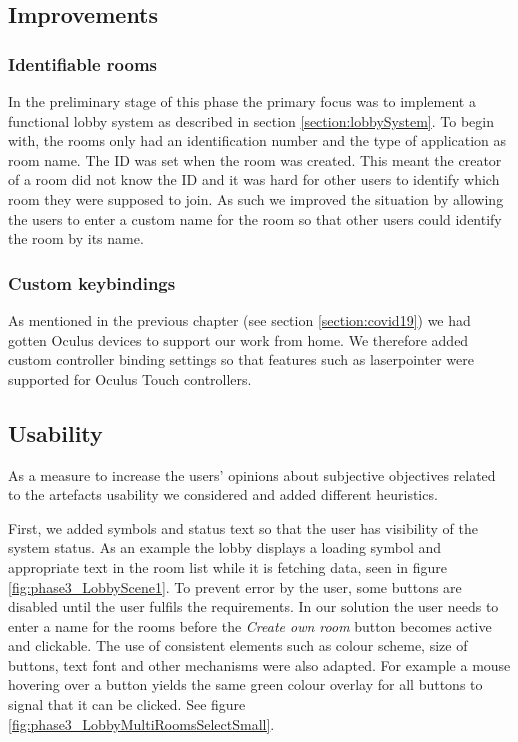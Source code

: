 \subsection{Improvements}


\subsubsection{Identifiable rooms}
In the preliminary stage of this phase the primary focus was to implement a functional lobby system as described in section \ref{section:lobbySystem}. To begin with, the rooms only had an identification number and the type of application as room name. The ID was set when the room was created. This meant the creator of a room did not know the ID and it was hard for other users to identify which room they were supposed to join. As such we improved the situation by allowing the users to enter a custom name for the room so that other users could identify the room by its name.   


\subsubsection{Custom keybindings}
As mentioned in the previous chapter (see section \ref{section:covid19}) we had gotten Oculus devices to support our work from home. We therefore added custom controller binding settings so that features such as laserpointer were supported for Oculus Touch controllers.   



\subsection{Usability}
As a measure to increase the users' opinions about subjective objectives related to the artefacts usability we considered and added different heuristics. 

First, we added symbols and status text so that the user has visibility of the system status. As an example the lobby displays a loading symbol and appropriate text in the room list while it is fetching data, seen in figure \ref{fig:phase3_LobbyScene1}.  
To prevent error by the user, some buttons are disabled until the user fulfils the requirements. In our solution the user needs to enter a name for the rooms before the \textit{Create own room} button becomes active and clickable.
The use of consistent elements such as colour scheme, size of buttons, text font and other mechanisms were also adapted. For example a mouse hovering over a button yields the same green colour overlay for all buttons to signal that it can be clicked. See figure \ref{fig:phase3_LobbyMultiRoomsSelectSmall}. 



